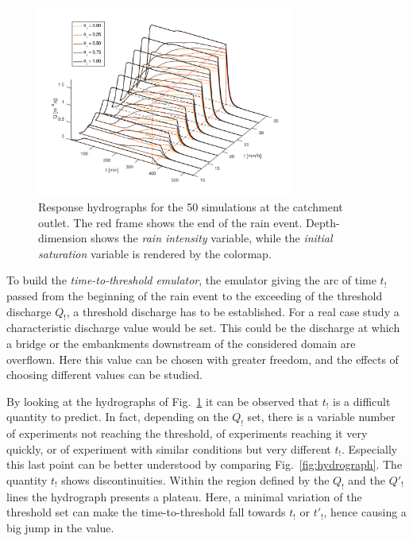 {\begin{figure}[h]
  \centering
  \includegraphics[width=0.75\textwidth]{Figures/hydrographs3d.png}
  \caption{Response hydrographs for the \num{50} simulations at the catchment outlet. The red frame shows the end of the rain event. Depth-dimension shows the \emph{rain intensity} variable, while the \emph{initial saturation} variable is rendered by the colormap.}
  \label{fig:hydrographs3d}
\end{figure}

To build the \emph{time-to-threshold emulator}, the emulator giving the arc of time $t_!$ passed from the beginning of the rain event to the exceeding of the threshold discharge $Q_!$, a threshold discharge has to be established.
For a real case study a characteristic discharge value would be set.
This could be the discharge at which a bridge or the embankments downstream of the considered domain are overflown.
Here this value can be chosen with greater freedom, and the effects of choosing different values can be studied.

By looking at the hydrographs of Fig.~\ref{fig:hydrographs3d} it can be observed that $t_!$ is a difficult quantity to predict.
In fact, depending on the $Q_!$ set, there is a variable number of experiments not reaching the threshold, of experiments reaching it very quickly, or of experiment with similar conditions but very different $t_!$.
Especially this last point can be better understood by comparing Fig.~\ref{fig:hydrograph}.
The quantity $t_!$ shows discontinuities.
Within the region defined by the $Q_!$ and the $Q'_!$ lines the hydrograph presents a plateau.
Here, a minimal variation of the threshold set can make the time-to-threshold fall towards $t_!$ or $t'_!$, hence causing a big jump in the value.

}
